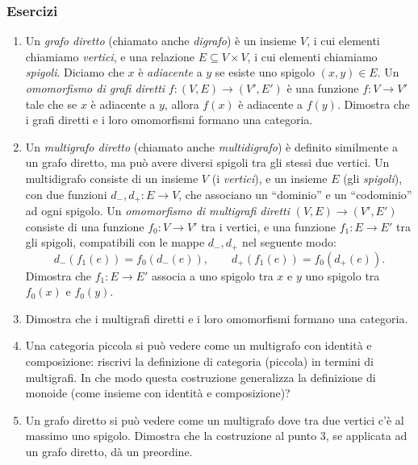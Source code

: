 \subsubsection*{Esercizi}
\begin{enumerate}
    \item Un \emph{grafo diretto} (chiamato anche \emph{digrafo}) è un insieme $V$, i cui elementi chiamiamo \emph{vertici}, e una relazione $E\subseteq V\times V$, i cui elementi chiamiamo \emph{spigoli}. Diciamo che $x$ è \emph{adiacente} a $y$ se esiste uno spigolo $(x,y)\in E$. Un \emph{omomorfismo di grafi diretti} $f:(V,E)\to (V',E')$ è una funzione $f:V\to V'$ tale che se $x$ è adiacente a $y$, allora $f(x)$ è adiacente a $f(y)$. Dimostra che i grafi diretti e i loro omomorfismi formano una categoria.
    \item Un \emph{multigrafo diretto} (chiamato anche \emph{multidigrafo}) è definito similmente a un grafo diretto, ma può avere diversi spigoli tra gli stessi due vertici. Un multidigrafo consiste di un insieme $V$ (i \emph{vertici}), e un insieme $E$ (gli \emph{spigoli}), con due funzioni $d_-,d_+:E\to V$, che associano un ``dominio'' e un ``codominio'' ad ogni spigolo. Un \emph{omomorfismo di multigrafi diretti} $(V,E)\to (V',E')$ consiste di una funzione $f_0:V\to V'$ tra i vertici, e una funzione $f_1:E\to E'$ tra gli spigoli, compatibili con le mappe $d_-,d_+$ nel seguente modo:
    \[
    d_-(f_1(e)) = f_0(d_-(e)) ,\qquad d_+(f_1(e)) = f_0(d_+(e)) .
    \]
    Dimostra che $f_1:E\to E'$ associa a uno spigolo tra $x$ e $y$ uno spigolo tra $f_0(x)$ e $f_0(y)$.
    \item Dimostra che i multigrafi diretti e i loro omomorfismi formano una categoria.
    \item Una categoria piccola si può vedere come un multigrafo con identità e composizione: riscrivi la definizione di categoria (piccola) in termini di multigrafi.  In che modo questa costruzione generalizza la definizione di monoide (come insieme con identità e composizione)?
    \item Un grafo diretto si può vedere come un multigrafo dove tra due vertici c'è al massimo uno spigolo. Dimostra che la costruzione al punto 3, se applicata ad un grafo diretto, dà un preordine.
\end{enumerate}
\color{black}
